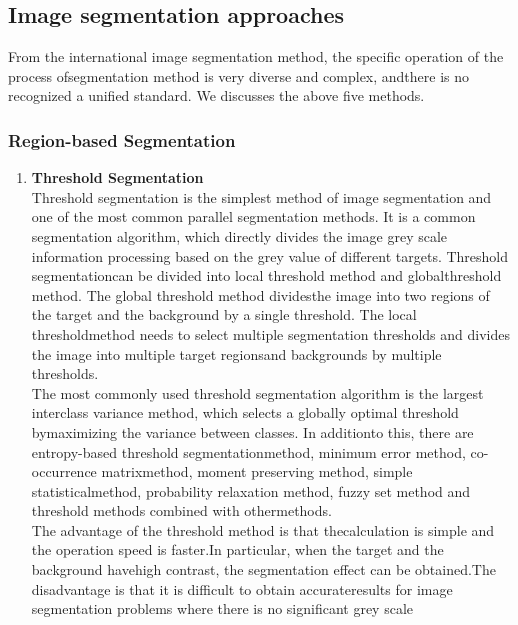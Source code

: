 \subsection{Image segmentation approaches}
From the international image segmentation method, the specific operation of the process ofsegmentation method is very 
diverse and complex, andthere is no recognized a unified standard. We discusses the above five methods.
\subsubsection{Region-based Segmentation}
        \begin{enumerate}{}
                \item \textbf{Threshold Segmentation}\\
                Threshold segmentation is the simplest method of image segmentation and one of the
                most common parallel segmentation methods. It is a common segmentation algorithm,
                which directly divides the image grey scale information processing based on the grey
                value of different targets. Threshold segmentationcan be divided into local threshold
                method and globalthreshold method. The global threshold method dividesthe image into
                two regions of the target and the background by a single threshold. The local thresholdmethod
                needs to select multiple segmentation thresholds and divides the image into multiple target
                regionsand backgrounds by multiple thresholds.\\
                The most commonly used threshold segmentation algorithm is the largest interclass variance method,
                which selects a globally optimal threshold bymaximizing the variance between classes.
                In additionto this, there are entropy-based threshold segmentationmethod, minimum error method,
                co-occurrence matrixmethod, moment preserving method, simple statisticalmethod, probability
                relaxation method, fuzzy set method and threshold methods combined with othermethods.\\
                The advantage of the threshold method is that thecalculation is simple and the operation
                speed is faster.In particular, when the target and the background havehigh contrast,
                the segmentation effect can be obtained.The disadvantage is that it is difficult to obtain
                accurateresults for image segmentation problems where there is no significant grey scale

\end{enumerate}
